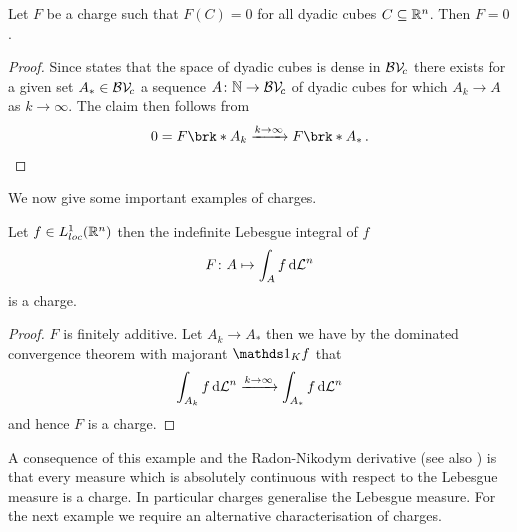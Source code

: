 \newpage
\begin{lemma}\label{le:DensityCubes}
Let $F$ be a charge such that $F(C)=0$ for all dyadic cubes $C\subseteq\mathbb{R}^n$. Then $F=0$.
\end{lemma}
\begin{proof}
Since \cite[Corollary 1.10.4]{Pfe2001} states that the space of dyadic cubes is dense in $\mathcal{BV\!}_c$ there exists for a given set $A_*\in \mathcal{BV\!}_c$ a sequence $A\colon\mathbb{N}\to\mathcal{BV\!}_c$ of dyadic cubes for which $A_k\to A$ as $k\to\infty$. The claim then follows from
\begin{align*}
	0=F\brk*{A_k}\xrightarrow{k\to\infty}F\brk*{A_*}\,.
\end{align*}
\end{proof}

\noindent We now give some important examples of charges.

\begin{claim}
Let $f\in L^1_{loc}(\mathbb{R}^n)$ then the indefinite Lebesgue integral of $f$
\begin{align}
	F\colon A\mapsto \int_Af\,\mathrm{d} \mathcal{L}^n\label{eq:LebesgueCharge}
\end{align}
is a charge.
\end{claim}
\begin{proof}
$F$ is finitely additive. Let $A_k\to A_*$ then we have by the dominated convergence theorem with majorant $\one_Kf$ that
\begin{align*}
	\int_{A_k}f\,\mathrm{d} \mathcal{L}^n\xrightarrow{k\to\infty}\int_{A_*}f\,\mathrm{d} \mathcal{L}^n
\end{align*}
and hence $F$ is a charge.
\end{proof}

\noindent A consequence of this example and the Radon-Nikodym derivative (see also \cite[Chapter 4.2]{Coh2013}) is that every measure which is absolutely continuous with respect to the Lebesgue measure is a charge. In particular charges generalise the Lebesgue measure. For the next example we require an alternative characterisation of charges.


